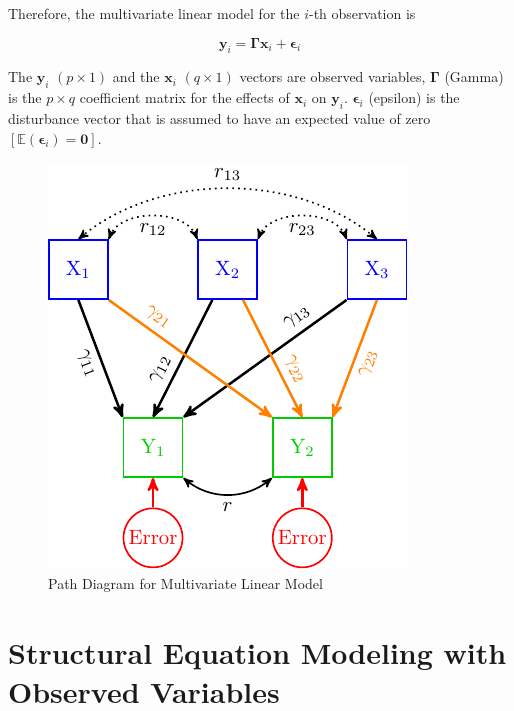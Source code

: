 Therefore, the multivariate linear model for the \(i\)-th observation is

\begin{equation}
\mathbf{y}_{i}  = \bm{\Gamma}\bm{x}_{i} +  \bm{\epsilon}_{i}
\label{eq:MLM3}
\end{equation}

The \(\mathbf{y}_{i}\) \(\left(p\times1\right)\) and the \(\mathbf{x}_{i}\)
\(\left(q\times1\right)\) vectors are observed variables, \(\bm{\Gamma}\) (Gamma) is the \(p\times q\) coefficient matrix for the effects of \(\mathbf{x}_{i}\) on \(\mathbf{y}_{i}\). \(\bm{\epsilon}_{i}\) (epsilon) is the disturbance vector that is assumed to have an expected value of zero \(\left[\mathbb{E}\left(\bm{\epsilon}_{i}\right)=\mathbf{0}\right]\).

\begin{figure}[H]

{\centering \includegraphics[width=0.8\linewidth]{images/MLM1} 

}

\caption{Path Diagram for Multivariate Linear Model}\label{fig:MLM1}
\end{figure}

\hypertarget{SEMO}{%
\chapter{Structural Equation Modeling with Observed Variables}\label{SEMO}}

